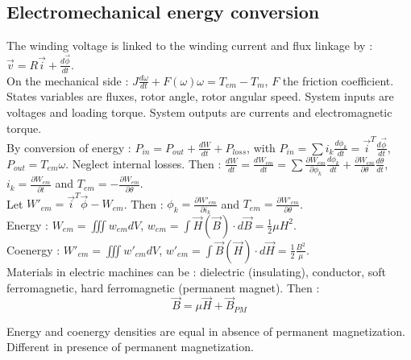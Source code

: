 \documentclass[../main.tex]{subfiles}
\begin{document}
\localtableofcontents

\subsection{Electromechanical energy conversion}
The winding voltage is linked to the winding current and flux linkage by : $\Vec{v} = R \Vec{i} + \frac{d\vec{\phi}}{dt}$.\\
On the mechanical side : $J \frac{d \omega}{dt} + F(\omega) \omega = T_{em}-T_m$, $F$ the friction coefficient. \\
States variables are fluxes, rotor angle, rotor angular speed. System inputs are voltages and loading torque. System outputs are currents and electromagnetic torque.\\
By conversion of energy : $P_{in} = P_{out} + \frac{dW}{dt} + P_{loss}$, with $P_{in} = \sum i_k \frac{d\phi_k}{dt} = \vec{i}^T \frac{d\vec{\phi}}{dt}$, $P_{out} = T_{em} \omega$. Neglect internal losses. Then : $\frac{dW}{dt} = \frac{dW_{em}}{dt} = \sum \frac{\partial W_{em}}{\partial \phi_k}\frac{d\phi_k}{dt}  + \frac{\partial W_{em}}{\partial \theta} \frac{d\theta}{dt}$, $i_k = \frac{\partial W_{em}}{\partial t}$ and $T_{em} = -\frac{\partial W_{em}}{\partial \theta}$.\\
Let $W'_{em} = \vec{i}^T \vec{\phi}-W_{em}$. Then : $\phi_k = \frac{\partial W'_{em}}{\partial i_k}$ and $T_{em} = \frac{\partial W'_{em}}{\partial \theta}$.\\

Energy : $W_{em} = \iiint w_{em} dV$, $w_{em} = \int \vec{H}(\vec{B}) \cdot d\vec{B} = \frac{1}{2}\mu H^2$.\\
Coenergy : $W'_{em} = \iiint w'_{em} dV$, $w'_{em} = \int \vec{B}(\vec{H})\cdot d\vec{H} = \frac{1}{2} \frac{B^2}{\mu}$.\\

Materials in electric machines can be : dielectric (insulating), conductor, soft ferromagnetic, hard ferromagnetic (permanent magnet). Then : \begin{equation}
    \vec{B} = \mu \vec{H} + \vec{B}_{PM}
\end{equation}

\warning Energy and coenergy densities are equal in absence of permanent magnetization. Different in presence of permanent magnetization. \\
\end{document}
